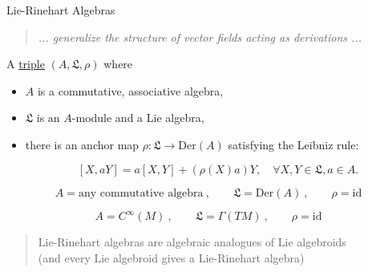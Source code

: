 \documentclass[beamer,10pt,handout]{standalone}  \Handouttrue
\begin{document}
\checkpoint


\begin{frame}{Lie-Rinehart Algebras}
  
  \begin{quote}
    \centering
    \emph{... generalize the structure of vector fields acting as derivations ...}
  \end{quote}
 
  \begin{defblock}
    A \underline{triple} $(A,\mathfrak{L},\rho)$ where
    \begin{itemize}[label=$\triangleright$]
      \item $A$ is a commutative, associative algebra,
      \item $\mathfrak{L}$ is an $A$-module and a Lie algebra,
      \item there is an anchor map $\rho: \mathfrak{L} \to \mathrm{Der}(A)$ satisfying the Leibniz rule:
      
      \vspace{-.5em}
        $$
          [X, aY] = a[X,Y] + (\rho(X)a)Y, \quad \forall X,Y \in \mathfrak{L}, a \in A.
        $$
    \end{itemize}

  \end{defblock}  
  \pause\vfill

  \begin{exblock}[Derivations]
    $$
      A=\text{any commutative algebra}~, \qquad \mathfrak{L}=\mathrm{Der}(A)~,\qquad \rho=\mathrm{id}
    $$ 
  \end{exblock}
  \pause\vfill

  \begin{exblock}
    $$
      A=C^\infty(M)~,  \qquad \mathfrak{L}=\Gamma(TM)~,\qquad \rho=\mathrm{id}
    $$ 
    \begin{quotation}
      \centering
      Lie-Rinehart algebras are algebraic analogues of Lie algebroids
      \\
      (and every Lie algebroid gives a Lie-Rinehart algebra)
    \end{quotation} 
  \end{exblock}
  \vfill

\end{frame}
\end{document}
